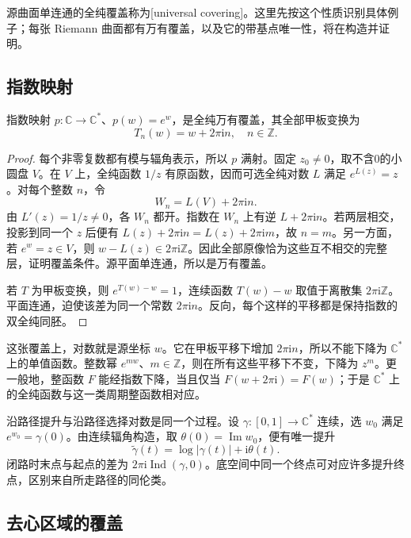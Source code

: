 \ProseParagraphBreak
源曲面单连通的全纯覆盖称为[universal covering]。这里先按这个性质识别具体例子；每张 Riemann 曲面都有万有覆盖，以及它的带基点唯一性，将在构造并证明。

\subsection{指数映射}
\label{b3:subsec:110202}

\begin{proposition}\label{b3:prop:11-exponential-cover}
指数映射 \(p:\mathbb C\to\mathbb C^*\)、\(p(w)=e^w\)，是全纯万有覆盖，其全部甲板变换为
\[
 T_n(w)=w+2\pi\mathrm{i}n,\quad n\in\mathbb Z.
\]
\end{proposition}
\begin{proof}
每个非零复数都有模与辐角表示，所以 \(p\) 满射。固定 \(z_0\ne0\)，取不含0的小圆盘 \(V\)。在 \(V\) 上，全纯函数 \(1/z\) 有原函数，因而可选全纯对数 \(L\) 满足 \(e^{L(z)}=z\)。对每个整数 \(n\)，令
\[
 W_n=L(V)+2\pi\mathrm{i}n.
\]
由 \(L'(z)=1/z\ne0\)，各 \(W_n\) 都开。指数在 \(W_n\) 上有逆 \(L+2\pi\mathrm{i}n\)。若两层相交，投影到同一个 \(z\) 后便有 \(L(z)+2\pi\mathrm{i}n=L(z)+2\pi\mathrm{i}m\)，故 \(n=m\)。另一方面，若 \(e^w=z\in V\)，则 \(w-L(z)\in2\pi\mathrm{i}\mathbb Z\)。因此全部原像恰为这些互不相交的完整层，证明覆盖条件。源平面单连通，所以是万有覆盖。

若 \(T\) 为甲板变换，则 \(e^{T(w)-w}=1\)，连续函数 \(T(w)-w\) 取值于离散集 \(2\pi\mathrm{i}\mathbb Z\)。平面连通，迫使该差为同一个常数 \(2\pi\mathrm{i}n\)。反向，每个这样的平移都是保持指数的双全纯同胚。
\end{proof}
这张覆盖上，对数就是源坐标 \(w\)。它在甲板平移下增加 \(2\pi\mathrm{i}n\)，所以不能下降为 \(\mathbb C^*\) 上的单值函数。整数幂 \(e^{mw}\)、\(m\in\mathbb Z\)，则在所有这些平移下不变，下降为 \(z^m\)。更一般地，整函数 \(F\) 能经指数下降，当且仅当 \(F(w+2\pi\mathrm{i})=F(w)\)；于是 \(\mathbb C^*\) 上的全纯函数与这一类周期整函数相对应。

\ProseParagraphBreak
沿路径提升与沿路径选择对数是同一个过程。设 \(\gamma:[0,1]\to\mathbb C^*\) 连续，选 \(w_0\) 满足 \(e^{w_0}=\gamma(0)\)。由连续辐角构造，取 \(\theta(0)=\operatorname{Im}w_0\)，便有唯一提升
\[
 \widetilde\gamma(t)=\log|\gamma(t)|+\mathrm{i}\theta(t).
\]
闭路时末点与起点的差为 \(2\pi\mathrm{i}\operatorname{Ind}(\gamma,0)\)。底空间中同一个终点可对应许多提升终点，区别来自所走路径的同伦类。

\subsection{去心区域的覆盖}
\label{b3:subsec:110203}

